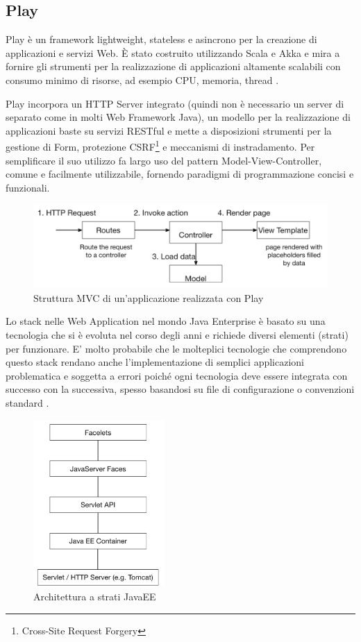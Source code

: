 \subsection{Play} \label{play}
Play è un framework lightweight, stateless e asincrono per la creazione di applicazioni e servizi Web. È stato costruito utilizzando Scala e Akka e mira a fornire gli strumenti per la realizzazione di applicazioni altamente scalabili con consumo minimo di risorse, ad esempio CPU, memoria, thread \cite{play-framework}.

\medskip

Play incorpora un HTTP Server integrato (quindi non è necessario un server di separato come in molti Web Framework Java), un modello per la realizzazione di applicazioni baste su servizi RESTful e mette a disposizioni strumenti per la gestione di Form, protezione CSRF\footnote{Cross-Site Request Forgery} e meccanismi di instradamento. Per semplificare il suo utilizzo fa largo uso del pattern Model-View-Controller, comune e facilmente utilizzabile, fornendo paradigmi di programmazione concisi e funzionali.

\begin{figure}[H]
\centering
\includegraphics[width=\textwidth]{figures/Play_structure.png}
\caption{Struttura MVC di un'applicazione realizzata con Play \cite{play_framework_book}}
\end{figure}

Lo stack nelle Web Application nel mondo Java Enterprise è basato su una tecnologia che si è evoluta nel corso degli anni e richiede diversi elementi (strati) per funzionare. E' molto probabile che le molteplici tecnologie che comprendono questo stack rendano anche l'implementazione di semplici applicazioni problematica e soggetta a errori poiché ogni tecnologia deve essere integrata con successo con la successiva, spesso basandosi su file di configurazione o convenzioni standard \cite{play_framework_book}.

\begin{figure}[H]
\centering
\includegraphics[width=5cm]{figures/Java_EE_layered_architecture.png}
\caption{Architettura a strati JavaEE \cite{play_framework_book}}
\label{Java_EE_layered_architecture}
\end{figure}


